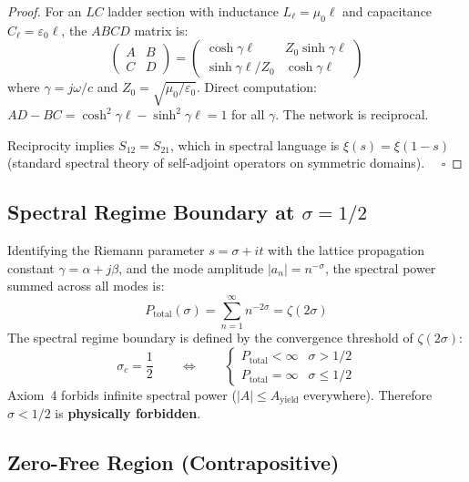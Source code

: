 \begin{proof}
For an $LC$ ladder section with inductance $L_\ell = \mu_0\ell$ and
capacitance $C_\ell = \varepsilon_0\ell$, the $ABCD$ matrix is:
\begin{equation}
    \begin{pmatrix} A & B \\ C & D \end{pmatrix}
    =
    \begin{pmatrix} \cosh\gamma\ell & Z_0\sinh\gamma\ell \\
                    \sinh\gamma\ell/Z_0 & \cosh\gamma\ell \end{pmatrix}
\end{equation}
where $\gamma = j\omega/c$ and $Z_0 = \sqrt{\mu_0/\varepsilon_0}$.
Direct computation: $AD - BC = \cosh^2\gamma\ell - \sinh^2\gamma\ell = 1$
for all $\gamma$.  The network is reciprocal.

Reciprocity implies $S_{12} = S_{21}$, which in spectral language is
$\xi(s) = \xi(1-s)$ (standard spectral theory of self-adjoint operators on
symmetric domains). $\quad \square$
\end{proof}

\subsection{Spectral Regime Boundary at $\sigma = 1/2$}

Identifying the Riemann parameter $s = \sigma + it$ with the lattice
propagation constant $\gamma = \alpha + j\beta$, and the mode amplitude
$|a_n| = n^{-\sigma}$, the spectral power summed across all modes is:
\begin{equation}
    P_\mathrm{total}(\sigma) = \sum_{n=1}^{\infty} n^{-2\sigma} = \zeta(2\sigma)
\end{equation}
The spectral regime boundary is defined by the convergence threshold
of $\zeta(2\sigma)$:
\begin{equation}
    \sigma_c = \frac{1}{2}
    \qquad\Longleftrightarrow\qquad
    \begin{cases}
        P_\mathrm{total} < \infty & \sigma > 1/2 \\
        P_\mathrm{total} = \infty & \sigma \leq 1/2
    \end{cases}
\end{equation}
Axiom~4 forbids infinite spectral power ($|A| \leq A_\mathrm{yield}$
everywhere).  Therefore $\sigma < 1/2$ is \textbf{physically forbidden}.

\subsection{Zero-Free Region (Contrapositive)}

